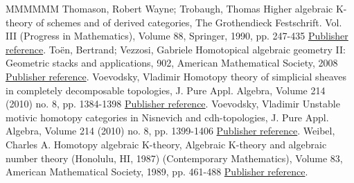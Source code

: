 \begin{thebibliography}{MMMMMM}
 Thomason, Robert Wayne; Trobaugh, Thomas Higher algebraic K-theory of schemes and of derived categories, The Grothendieck Festschrift. Vol. III (Progress in Mathematics), Volume 88, Springer, 1990, pp. 247-435 \href{https://ahl.centre-mersenne.org/item/AHL_2020__3__1091_0/#ThomasonTrobaugh}{Publisher reference}.
 Toën, Bertrand; Vezzosi, Gabriele Homotopical algebraic geometry II: Geometric stacks and applications, 902, American Mathematical Society, 2008 \href{https://ahl.centre-mersenne.org/item/AHL_2020__3__1091_0/#HAG2}{Publisher reference}.
 Voevodsky, Vladimir Homotopy theory of simplicial sheaves in completely decomposable topologies, J. Pure Appl. Algebra, Volume 214 (2010) no. 8, pp. 1384-1398 \href{https://ahl.centre-mersenne.org/item/AHL_2020__3__1091_0/#VoevodskyCD}{Publisher reference}.
 Voevodsky, Vladimir Unstable motivic homotopy categories in Nisnevich and cdh-topologies, J. Pure Appl. Algebra, Volume 214 (2010) no. 8, pp. 1399-1406 \href{https://ahl.centre-mersenne.org/item/AHL_2020__3__1091_0/#VoevodskyCdh}{Publisher reference}.
 Weibel, Charles A. Homotopy algebraic K-theory, Algebraic K-theory and algebraic number theory (Honolulu, HI, 1987) (Contemporary Mathematics), Volume 83, American Mathematical Society, 1989, pp. 461-488 \href{https://ahl.centre-mersenne.org/item/AHL_2020__3__1091_0/#WeibelKH}{Publisher reference}.
\end{thebibliography}
